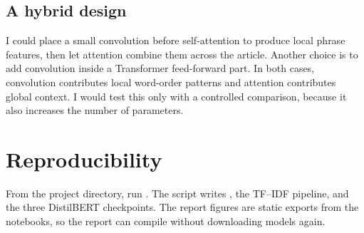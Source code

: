 \documentclass[11pt,a4paper]{article}
\begin{document}
\subsection*{A hybrid design}
I could place a small convolution before self-attention to produce local phrase features, then let attention combine them across the article. Another choice is to add convolution inside a Transformer feed-forward part. In both cases, convolution contributes local word-order patterns and attention contributes global context. I would test this only with a controlled comparison, because it also increases the number of parameters.

\section{Reproducibility}
From the project directory, run . The script writes , the TF--IDF pipeline, and the three DistilBERT checkpoints. The report figures are static exports from the notebooks, so the report can compile without downloading models again.
\end{document}
